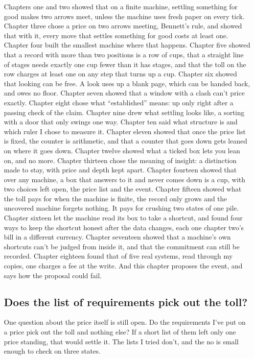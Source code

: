 \documentclass[11pt,twoside]{article}
\theoremstyle{thielethm}
\theoremstyle{thieledef}
\theoremstyle{thieledef}
\theoremstyle{thieledef}
\theoremstyle{thielethm}
\theoremstyle{thieleobs}
\theoremstyle{thielethm}
\begin{document}
Chapters one and two showed that on a finite machine, settling something for good makes two arrows meet, unless the machine uses fresh paper on every tick. Chapter three chose a price on two arrows meeting, Bennett's rule, and showed that with it, every move that settles something for good costs at least one. Chapter four built the smallest machine where that happens. Chapter five showed that a record with more than two positions is a row of cups, that a straight line of stages needs exactly one cup fewer than it has stages, and that the toll on the row charges at least one on any step that turns up a cup. Chapter six showed that looking can be free. A look uses up a blank page, which can be handed back, and owes no floor. Chapter seven showed that a window with a clash can't price exactly. Chapter eight chose what ``established'' means: up only right after a passing check of the claim. Chapter nine drew what settling looks like, a sorting with a door that only swings one way. Chapter ten said what structure is and which ruler I chose to measure it. Chapter eleven showed that once the price list is fixed, the counter is arithmetic, and that a counter that goes down gets leaned on where it goes down. Chapter twelve showed what a ticked box lets you lean on, and no more. Chapter thirteen chose the meaning of insight: a distinction made to stay, with price and depth kept apart. Chapter fourteen showed that over any machine, a box that answers to it and never comes down is a cup, with two choices left open, the price list and the event. Chapter fifteen showed what the toll pays for when the machine is finite, the record only grows and the uncovered machine forgets nothing. It pays for crushing two states of one pile. Chapter sixteen let the machine read its box to take a shortcut, and found four ways to keep the shortcut honest after the data changes, each one chapter two's bill in a different currency. Chapter seventeen showed that a machine's own shortcuts can't be judged from inside it, and that the commitment can still be recorded. Chapter eighteen found that of five real systems, read through my copies, one charges a fee at the write. And this chapter proposes the event, and says how the proposal could fail.

\subsection{Does the list of requirements pick out the toll?}

One question about the price itself is still open. Do the requirements I've put on a price pick out the toll and nothing else? If a short list of them left only one price standing, that would settle it. The lists I tried don't, and the no is small enough to check on three states.
\end{document}
